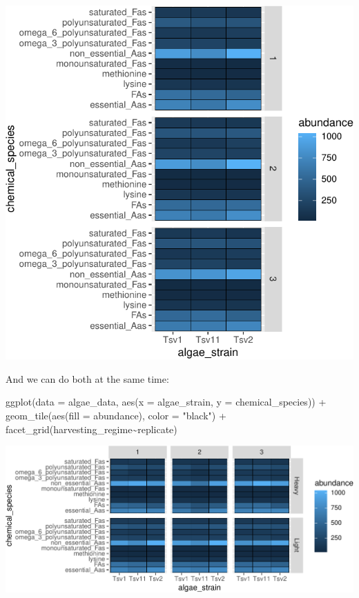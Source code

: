 \documentclass[
]{krantz}
\newenvironment{Shaded}{\begin{snugshade}}{\end{snugshade}}
\newcommand{\AttributeTok}[1]{\textcolor[rgb]{0.77,0.63,0.00}{#1}}
\newcommand{\FunctionTok}[1]{\textcolor[rgb]{0.00,0.00,0.00}{#1}}
\newcommand{\NormalTok}[1]{#1}
\newcommand{\SpecialCharTok}[1]{\textcolor[rgb]{0.00,0.00,0.00}{#1}}
\newcommand{\StringTok}[1]{\textcolor[rgb]{0.31,0.60,0.02}{#1}}
\begin{document}
\begin{center}\includegraphics[width=0.8\linewidth]{index_files/figure-latex/unnamed-chunk-58-1} \end{center}

And we can do both at the same time:

\begin{Shaded}
\begin{Highlighting}[]
\FunctionTok{ggplot}\NormalTok{(}\AttributeTok{data =}\NormalTok{ algae\_data, }\FunctionTok{aes}\NormalTok{(}\AttributeTok{x =}\NormalTok{ algae\_strain, }\AttributeTok{y =}\NormalTok{ chemical\_species)) }\SpecialCharTok{+} 
  \FunctionTok{geom\_tile}\NormalTok{(}\FunctionTok{aes}\NormalTok{(}\AttributeTok{fill =}\NormalTok{ abundance), }\AttributeTok{color =} \StringTok{"black"}\NormalTok{) }\SpecialCharTok{+} 
  \FunctionTok{facet\_grid}\NormalTok{(harvesting\_regime}\SpecialCharTok{\textasciitilde{}}\NormalTok{replicate)}
\end{Highlighting}
\end{Shaded}

\begin{center}\includegraphics[width=0.8\linewidth]{index_files/figure-latex/unnamed-chunk-59-1} \end{center}
\end{document}

